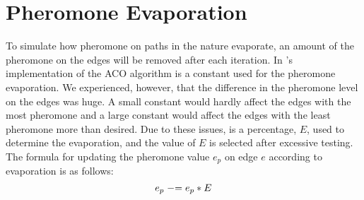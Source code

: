 \section{Pheromone Evaporation}
\label{sec:evaporation}
To simulate how pheromone on paths in the nature evaporate, an amount of the pheromone on the edges will be removed after each iteration. In \citet{nanda11}'s implementation of the ACO algorithm is a constant used for the pheromone evaporation. We experienced, however, that the difference in the pheromone level on the edges was huge. A small constant would hardly affect the edges with the most pheromone and a large constant would affect the edges with the least pheromone more than desired. Due to these issues, is a percentage, $E$, used to determine the evaporation, and the value of $E$ is selected after excessive testing.
The formula for updating the pheromone value $e_p$ on edge $e$ according to evaporation is as follows: 
\newline
$$e_p \mathrel{-}= e_p*E$$
\newline


